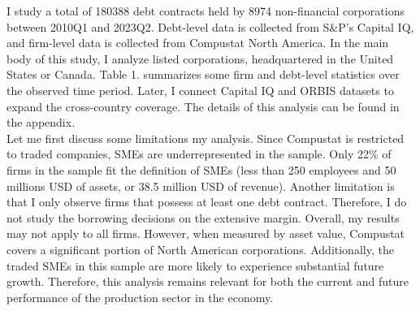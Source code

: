 \documentclass[12pt]{article}
\begin{document}
I study a total of 180388 debt contracts held by 8974 non-financial corporations between 2010Q1 and 2023Q2. Debt-level data is collected from S\&P's Capital IQ, and firm-level data is collected from Compustat North America. In the main body of this study, I analyze listed corporations, headquartered in the United States or Canada. Table 1. summarizes some firm and debt-level statistics over the observed time period. Later, I connect Capital IQ and ORBIS datasets to expand the cross-country coverage. The details of this analysis can be found in the appendix. \vspace{3mm} \\ 
Let me first discuss some limitations my analysis. Since Compustat is restricted to traded companies, SMEs are underrepresented in the sample. Only 22\% of firms in the sample fit the definition of SMEs (less than 250 employees and 50 millions USD of assets, or 38.5 million USD of revenue). Another limitation is that I only observe firms that possess at least one debt contract. Therefore, I do not study the borrowing decisions on the extensive margin. Overall, my results may not apply to all firms. However, when measured by asset value, Compustat covers a significant portion of North American corporations. Additionally, the traded SMEs in this sample are more likely to experience substantial future growth. Therefore, this analysis remains relevant for both the current and future performance of the production sector in the economy.
\end{document}
